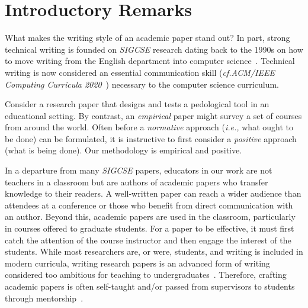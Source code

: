 \documentclass[sigconf]{acmart}
\newcommand{\ie}{\textit{i.e.,}\xspace}
\newcommand{\cf}{\textit{cf.}\xspace}
\begin{document}



\maketitle

\section{Introductory Remarks}

What makes the writing style of an academic paper stand out? In part, strong technical writing is founded on \textit{SIGCSE} research dating back to the 1990s on how to move writing from the English department into computer science~\cite{Pes91,TP93,FPC96,Kay98}. Technical writing is now considered an essential communication skill (\cf \textit{ACM/IEEE Computing Curricula 2020}~\cite{CC2020,CC2020report}) necessary to the computer science curriculum.

Consider a research paper that designs and tests a pedological tool in an educational setting. By contrast, an \textit{empirical} paper might survey a set of courses from around the world. Often before a \textit{normative} approach (\ie what ought to be done) can be formulated, it is instructive to first consider a \textit{positive} approach (what is being done). Our methodology is empirical and positive. 

In a departure from many \textit{SIGCSE} papers, educators in our work are not teachers in a classroom but are authors of academic papers who transfer knowledge to their readers. A well-written paper can reach a wider audience than attendees at a conference or those who benefit from direct communication with an author. Beyond this, academic papers are used in the classroom, particularly in courses offered to graduate students. For a paper to be effective, it must first catch the attention of the course instructor and then engage the interest of the students. While most researchers are, or were, students, and writing is included in modern curricula, writing research papers is an advanced form of writing considered too ambitious for teaching to undergraduates~\cite{Gar10}. Therefore, crafting academic papers is often self-taught and/or passed from supervisors to students through mentorship~\cite{Mir11}.  
\end{document}
